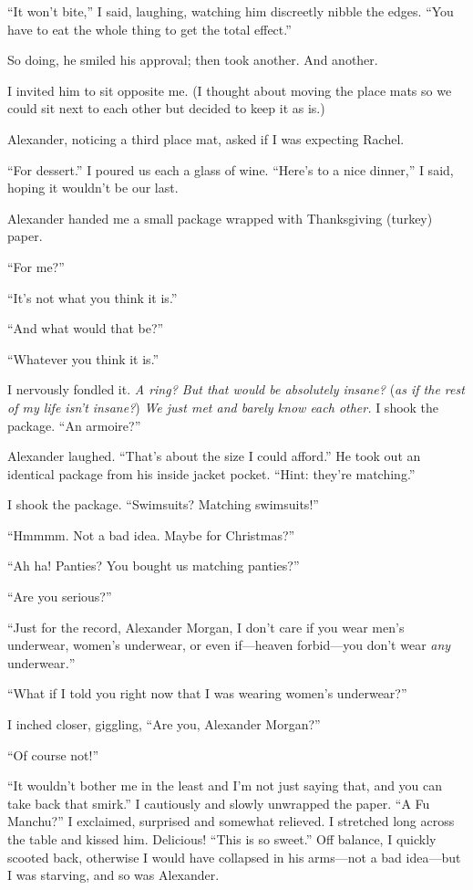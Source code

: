 ``It won't bite,'' I said, laughing, watching him discreetly nibble the
edges. ``You have to eat the whole thing to get the total effect.''

So doing, he smiled his approval; then took another. And another.

I invited him to sit opposite me. (I thought about moving the place mats
so we could sit next to each other but decided to keep it as is.)

Alexander, noticing a third place mat, asked if I was expecting Rachel.

``For dessert.'' I poured us each a glass of wine. ``Here's to a nice
dinner,'' I said, hoping it wouldn't be our last.

Alexander handed me a small package wrapped with Thanksgiving (turkey)
paper.

``For me?''

``It's not what you think it is.''

``And what would that be?''

``Whatever you think it is.''

I nervously fondled it. \emph{A ring? But that would be absolutely
insane?} (\emph{as if the rest of my life isn't insane?}) \emph{We just
met and barely know each other.} I shook the package. ``An armoire?''

Alexander laughed. ``That's about the size I could afford.'' He took out
an identical package from his inside jacket pocket. ``Hint: they're
matching.''

I shook the package. ``Swimsuits? Matching swimsuits!''

``Hmmmm. Not a bad idea. Maybe for Christmas?''

``Ah ha! Panties? You bought us matching panties?''

``Are you serious?''

``Just for the record, Alexander Morgan, I don't care if you wear men's
underwear, women's underwear, or even if---heaven forbid---you don't
wear \emph{any} underwear\emph{.}''

``What if I told you right now that I was wearing women's underwear?''

I inched closer, giggling, ``Are you, Alexander Morgan?''

``Of course not!''

``It wouldn't bother me in the least and I'm not just saying that, and
you can take back that smirk.'' I cautiously and slowly unwrapped the
paper. ``A Fu Manchu?'' I exclaimed, surprised and somewhat relieved. I
stretched long across the table and kissed him. Delicious! ``This is so
sweet.'' Off balance, I quickly scooted back, otherwise I would have
collapsed in his arms---not a bad idea---but I was starving, and so was
Alexander.

